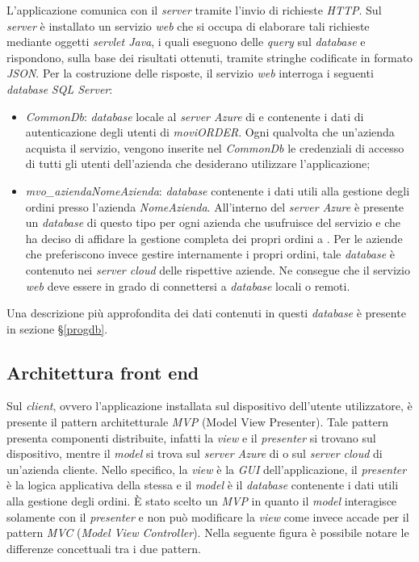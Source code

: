 L'applicazione comunica con il \textit{server} tramite l'invio di richieste \textit{HTTP}. Sul \textit{server} è installato un servizio \textit{web} che si occupa di elaborare tali richieste mediante oggetti \textit{servlet Java}, i quali eseguono delle \textit{query} sul \textit{database} e rispondono, sulla base dei risultati ottenuti, tramite stringhe codificate in formato \textit{JSON}. Per la costruzione delle risposte, il servizio \textit{web} interroga i seguenti \textit{database} \textit{SQL Server}:
\begin{itemize}
	\item \textit{CommonDb}: \textit{database} locale al \textit{server Azure} di \visione{} e contenente i dati di autenticazione degli utenti di \textit{moviORDER}. Ogni qualvolta che un'azienda acquista il servizio, vengono inserite nel \textit{CommonDb} le credenziali di accesso di tutti gli utenti dell'azienda che desiderano utilizzare l'applicazione;
	\item \textit{mvo\_aziendaNomeAzienda}: \textit{database} contenente i dati utili alla gestione degli ordini presso l'azienda \textit{NomeAzienda}. All'interno del \textit{server Azure} è presente un \textit{database} di questo tipo per ogni azienda che usufruisce del servizio e che ha deciso di affidare la gestione completa dei propri ordini a \visione{}. Per le aziende che preferiscono invece gestire internamente i propri ordini, tale \textit{database} è contenuto nei \textit{server cloud} delle rispettive aziende. Ne consegue che il servizio \textit{web} deve essere in grado di connettersi a \textit{database} locali o remoti.
\end{itemize}
Una descrizione più approfondita dei dati contenuti in questi \textit{database} è presente in sezione §\ref{progdb}.

\subsection{Architettura front end}

Sul \textit{client}, ovvero l'applicazione installata sul dispositivo dell'utente utilizzatore, è presente il pattern architetturale \textit{MVP} (Model View Presenter). Tale pattern presenta componenti distribuite, infatti la \textit{view} e il \textit{presenter} si trovano sul dispositivo, mentre il \textit{model} si trova sul \textit{server Azure} di \visione{} o sul \textit{server cloud} di un'azienda cliente. Nello specifico, la \textit{view} è la \textit{GUI} dell'applicazione, il \textit{presenter} è la logica applicativa della stessa e il \textit{model} è il \textit{database} contenente i dati utili alla gestione degli ordini. È stato scelto un \textit{MVP} in quanto il \textit{model} interagisce solamente con il \textit{presenter} e non può modificare la \textit{view} come invece accade per il pattern \textit{MVC} (\textit{Model View Controller}). Nella seguente figura è possibile notare le differenze concettuali tra i due pattern.

